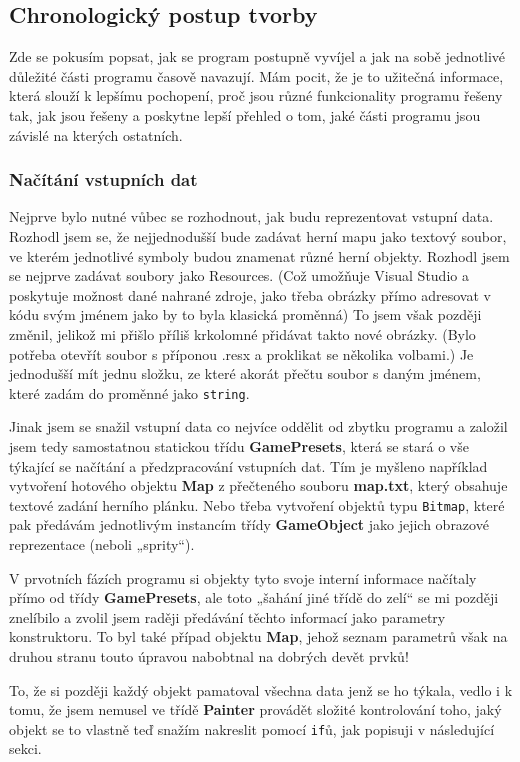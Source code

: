\documentclass[a4]{article}
\begin{document}
\subsection{Chronologický postup tvorby}
Zde se pokusím popsat, jak se program postupně vyvíjel a jak na sobě jednotlivé důležité části programu časově navazují. Mám pocit, že je to užitečná informace, která slouží k lepšímu pochopení, proč jsou různé funkcionality programu řešeny tak, jak jsou řešeny a poskytne lepší přehled o tom, jaké části programu jsou závislé na kterých ostatních.
\subsubsection{Načítání vstupních dat}
Nejprve bylo nutné vůbec se rozhodnout, jak budu reprezentovat vstupní data. Rozhodl jsem se, že nejjednodušší bude zadávat herní mapu jako textový soubor, ve kterém jednotlivé symboly budou znamenat různé herní objekty. Rozhodl jsem se nejprve zadávat soubory jako Resources. (Což umožňuje Visual Studio a poskytuje možnost dané nahrané zdroje, jako třeba obrázky přímo adresovat v kódu svým jménem jako by to byla klasická proměnná) To jsem však později změnil, jelikož mi přišlo příliš krkolomné přidávat takto nové obrázky. (Bylo potřeba otevřít soubor s příponou .resx a proklikat se několika volbami.) Je jednodušší mít jednu složku, ze které akorát přečtu soubor s daným jménem, které zadám do proměnné jako \verb|string|.

Jinak jsem se snažil vstupní data co nejvíce oddělit od zbytku programu a založil jsem tedy samostatnou statickou třídu \textbf{GamePresets}, která se stará o vše týkající se načítání a předzpracování vstupních dat. Tím je myšleno například vytvoření hotového objektu \textbf{Map} z přečteného souboru \textbf{map.txt}, který obsahuje textové zadání herního plánku. Nebo třeba vytvoření objektů typu \verb|Bitmap|, které pak předávám jednotlivým instancím třídy \textbf{GameObject} jako jejich obrazové reprezentace (neboli „sprity“).

V prvotních fázích programu si objekty tyto svoje interní informace načítaly přímo od třídy \textbf{GamePresets}, ale toto „šahání jiné třídě do zelí“ se mi později znelíbilo a zvolil jsem raději předávání těchto informací jako parametry konstruktoru. To byl také případ objektu \textbf{Map}, jehož seznam parametrů však na druhou stranu touto úpravou nabobtnal na dobrých devět prvků!

To, že si později každý objekt pamatoval všechna data jenž se ho týkala, vedlo i k tomu, že jsem nemusel ve třídě \textbf{Painter} provádět složité kontrolování toho, jaký objekt se to vlastně teď snažím nakreslit pomocí \verb|if|ů, jak popisuji v následující sekci.
\end{document}
